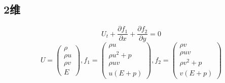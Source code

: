 \documentclass[UTF8]{ctexart}
\begin{document}
  \subsection{2维}
\begin{equation*}
     U_t+\frac{\partial f_1}{\partial x} + \frac{\partial f_2}{\partial y} =0
     \end{equation*}
     \begin{equation*}
     U=\left( \begin{matrix}
                \rho \\
                \rho u \\
                \rho v \\
                E
              \end{matrix}\right) ,  f_1=\left( \begin{matrix}
                \rho u \\
                \rho u^2+p \\
                \rho uv \\
                u(E+p)
              \end{matrix}\right), f_2=\left( \begin{matrix}
                \rho v \\
                \rho uv \\
                \rho v^2+p \\
                v(E+p)
              \end{matrix}\right)
\end{equation*}
\end{document}
